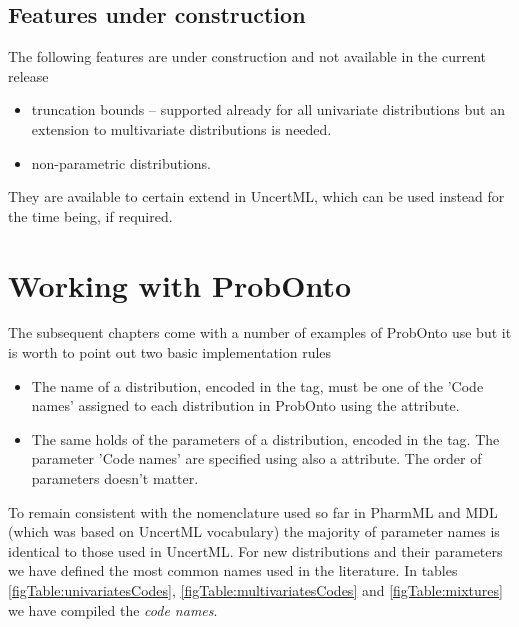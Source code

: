 \subsection{Features under construction}
The following features are under construction and not available in the current 
release
\begin{itemize}
\item
truncation bounds -- supported already for all univariate distributions but an extension 
to multivariate distributions is needed.
\item
non-parametric distributions.
\end{itemize}
They are available to certain extend in UncertML, which can be used instead for the time being, if required.


\section{Working with ProbOnto}
\label{sec:workingProbOnto}
The subsequent chapters come with a number of examples of ProbOnto use
but it is worth to point out two basic implementation rules 
\begin{itemize}
\item 
The name of a distribution, encoded in the  tag, 
must be one of the 'Code names' assigned to each distribution in ProbOnto
using the  attribute. 
\item
The same holds of the parameters of a distribution, encoded in the  tag.
The parameter 'Code names' are specified using also a  attribute. 
The order of parameters doesn't matter. 
\end{itemize}
To remain consistent with the nomenclature used so far in PharmML and MDL (which
was based on UncertML vocabulary) the majority of parameter names is identical 
to those used in UncertML. For new distributions and their parameters we have 
defined the most common names used in the literature. 
In tables \ref{figTable:univariatesCodes}, \ref{figTable:multivariatesCodes} 
and \ref{figTable:mixtures} we have compiled the \emph{code names}. 

